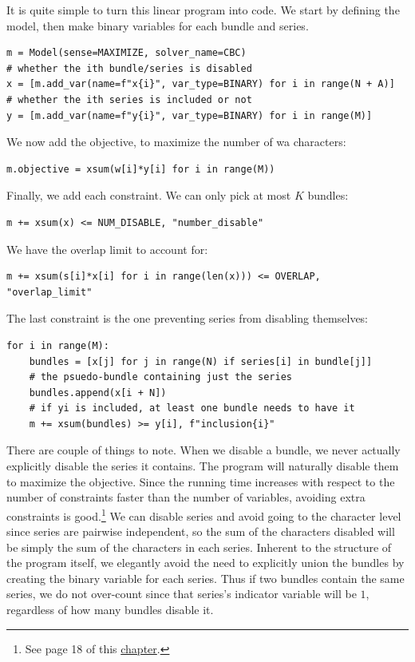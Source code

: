 \documentclass[11pt, oneside]{article}
\theoremstyle{plain}
\theoremstyle{definition}
\begin{document}
It is quite simple to turn this linear program into code. We start by
defining the model, then make binary variables for each bundle and series.
\begin{verbatim}
m = Model(sense=MAXIMIZE, solver_name=CBC)
# whether the ith bundle/series is disabled
x = [m.add_var(name=f"x{i}", var_type=BINARY) for i in range(N + A)]
# whether the ith series is included or not
y = [m.add_var(name=f"y{i}", var_type=BINARY) for i in range(M)]
\end{verbatim}

We now add the objective, to maximize the number of wa characters:
\begin{verbatim}
m.objective = xsum(w[i]*y[i] for i in range(M))
\end{verbatim}

Finally, we add each constraint. We can only pick at most \( K \) bundles:
\begin{verbatim}
m += xsum(x) <= NUM_DISABLE, "number_disable"
\end{verbatim}

We have the overlap limit to account for:
\begin{verbatim}
m += xsum(s[i]*x[i] for i in range(len(x))) <= OVERLAP, "overlap_limit"
\end{verbatim}

The last constraint is the one preventing series from disabling themselves:
\begin{verbatim}
for i in range(M):
    bundles = [x[j] for j in range(N) if series[i] in bundle[j]]
    # the psuedo-bundle containing just the series
    bundles.append(x[i + N])
    # if yi is included, at least one bundle needs to have it
    m += xsum(bundles) >= y[i], f"inclusion{i}"
\end{verbatim}

There are couple of things to note. When we disable a bundle, we never
actually explicitly disable the series it contains. The program will
naturally disable them to maximize the objective. Since the running time
increases with respect to the number of constraints faster than the number
of variables, avoiding extra constraints is good.\footnote{See page 18 of
this \href{http://web.mit.edu/15.053/www/AMP-Chapter-04.pdf}{chapter}.}
We can disable series and avoid going to the character level since series
are pairwise independent, so the sum of the characters disabled will be
simply the sum of the characters in each series. Inherent to the structure
of the program itself, we elegantly avoid the need to explicitly union the
bundles by creating the binary variable for each series. Thus if two bundles
contain the same series, we do not over-count since that series's indicator
variable will be \( 1 \), regardless of how many bundles disable it.
\end{document}
